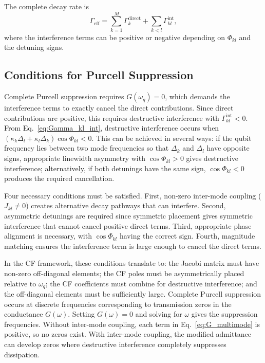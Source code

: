 \documentclass[reprint, floatfix, superscriptaddress, amsmath, amssymb, longbibliography]{revtex4-2}
\begin{document}
The complete decay rate is
\begin{equation}
\Gamma_{\mathrm{eff}} = \sum_{k=1}^{M} \Gamma_k^{\mathrm{direct}} + \sum_{k < l} \Gamma_{kl}^{\mathrm{int}},
\label{eq:Gamma_total}
\end{equation}
where the interference terms can be positive or negative depending on $\Phi_{kl}$ and the detuning signs.

\subsection{Conditions for Purcell Suppression}
\label{sec:purcell_suppression}

Complete Purcell suppression requires $G(\omega_q) = 0$, which demands the interference terms to exactly cancel the direct contributions. Since direct contributions are positive, this requires destructive interference with $\Gamma_{kl}^{\mathrm{int}} < 0$. From Eq.~\eqref{eq:Gamma_kl_int}, destructive interference occurs when $(\kappa_k\Delta_l + \kappa_l\Delta_k)\cos\Phi_{kl} < 0$. This can be achieved in several ways: if the qubit frequency lies between two mode frequencies so that $\Delta_k$ and $\Delta_l$ have opposite signs, appropriate linewidth asymmetry with $\cos\Phi_{kl} > 0$ gives destructive interference; alternatively, if both detunings have the same sign, $\cos\Phi_{kl} < 0$ produces the required cancellation.

Four necessary conditions must be satisfied. First, non-zero inter-mode coupling ($J_{kl} \neq 0$) creates alternative decay pathways that can interfere. Second, asymmetric detunings are required since symmetric placement gives symmetric interference that cannot cancel positive direct terms. Third, appropriate phase alignment is necessary, with $\cos\Phi_{kl}$ having the correct sign. Fourth, magnitude matching ensures the interference term is large enough to cancel the direct terms.

In the CF framework, these conditions translate to: the Jacobi matrix must have non-zero off-diagonal elements; the CF poles must be asymmetrically placed relative to $\omega_q$; the CF coefficients must combine for destructive interference; and the off-diagonal elements must be sufficiently large. Complete Purcell suppression occurs at discrete frequencies corresponding to transmission zeros in the conductance $G(\omega)$. Setting $G(\omega) = 0$ and solving for $\omega$ gives the suppression frequencies. Without inter-mode coupling, each term in Eq.~\eqref{eq:G_multimode} is positive, so no zeros exist. With inter-mode coupling, the modified admittance can develop zeros where destructive interference completely suppresses dissipation.
\end{document}
